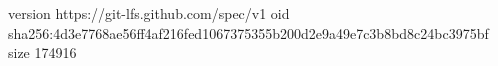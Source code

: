 version https://git-lfs.github.com/spec/v1
oid sha256:4d3e7768ae56ff4af216fed1067375355b200d2e9a49e7c3b8bd8c24bc3975bf
size 174916
